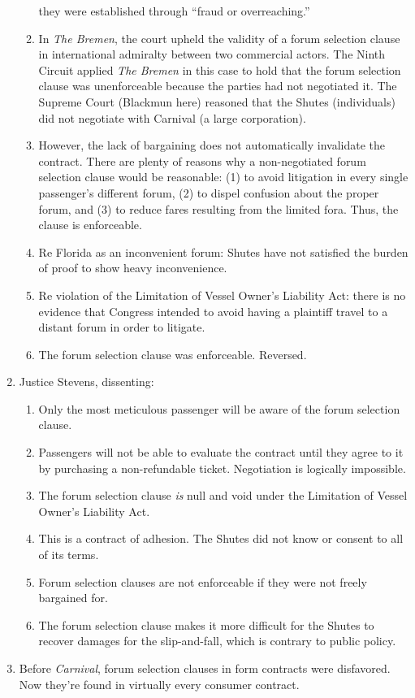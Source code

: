 \begin{enumerate}
\begin{enumerate}
        they were established through ``fraud or overreaching.''
        \item In \emph{The Bremen}, the court upheld the validity of a forum 
        selection clause in international admiralty between two commercial 
        actors. The Ninth Circuit applied \emph{The Bremen} in this case to 
        hold that the forum selection clause was unenforceable because the 
        parties had not negotiated it. The Supreme Court (Blackmun here) 
        reasoned that the Shutes (individuals) did not negotiate with Carnival 
        (a large corporation).
        \item However, the lack of bargaining does not automatically 
        invalidate the contract. There are plenty of reasons why a 
        non-negotiated forum selection clause would be reasonable: (1) to 
        avoid litigation in every single passenger's different forum, (2) to 
        dispel confusion about the proper forum, and (3) to reduce fares 
        resulting from the limited fora. Thus, the clause is enforceable.
        \item Re Florida as an inconvenient forum: Shutes have not satisfied 
        the burden of proof to show heavy inconvenience.
        \item Re violation of the Limitation of Vessel Owner's Liability Act: 
        there is no evidence that Congress intended to avoid having a 
        plaintiff travel to a distant forum in order to litigate.
        \item The forum selection clause was enforceable. Reversed.
    \end{enumerate}
    \item Justice Stevens, dissenting:
    \begin{enumerate}
        \item Only the most meticulous passenger will be aware of the forum 
        selection clause.
        \item Passengers will not be able to evaluate the contract until they 
        agree to it by purchasing a non-refundable ticket. Negotiation is 
        logically impossible.
        \item The forum selection clause \emph{is} null and void under the 
        Limitation of Vessel Owner's Liability Act.
        \item This is a contract of adhesion. The Shutes did not know or 
        consent to all of its terms.
        \item Forum selection clauses are not enforceable if they were not 
        freely bargained for.
        \item The forum selection clause makes it more difficult for the 
        Shutes to recover damages for the slip-and-fall, which is contrary to 
        public policy.
    \end{enumerate}
    \item Before \emph{Carnival}, forum selection clauses in form contracts 
    were disfavored. Now they're found in virtually every consumer contract.
\end{enumerate}

